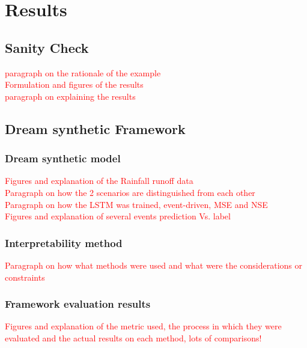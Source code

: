 \documentclass[12pt]{report}
\begin{document}
\newpage






\chapter{Results} 
 
\section{Sanity Check}
\textcolor{red}{paragraph on the rationale of the example}\\

\textcolor{red}{Formulation and figures of the results}\\

\textcolor{red}{paragraph on explaining the results}\\
\newpage
\section{Dream synthetic Framework}
\subsection{Dream synthetic model}
\textcolor{red}{Figures and explanation of the Rainfall runoff data}\\

\textcolor{red}{Paragraph on how the 2 scenarios are distinguished from each other }\\

\textcolor{red}{Paragraph on how the LSTM was trained, event-driven, MSE and NSE}\\

\textcolor{red}{Figures and explanation of several events prediction Vs. label}\\
\subsection{Interpretability method}

\textcolor{red}{Paragraph on how what methods were used and what were the considerations or constraints}\\

\subsection{Framework evaluation results}
\textcolor{red}{Figures and explanation of the metric used, the process in which they were evaluated and the actual results on each method, lots of comparisons!}\\
\end{document}
